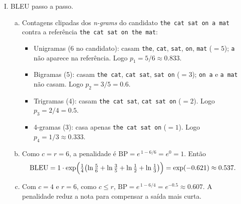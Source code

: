 \documentclass{dlproblemset}
\begin{document}
\begin{enumerate}[I)]
\item BLEU passo a passo.
\begin{enumerate}[(a)]
    \item Contagens clipadas dos \textit{n-grams} do candidato \texttt{the cat sat on a mat}
    contra a referência \texttt{the cat sat on the mat}:
    \begin{itemize}
        \item Unigramas (6 no candidato): casam \texttt{the}, \texttt{cat}, \texttt{sat},
        \texttt{on}, \texttt{mat} ($=5$); \texttt{a} não aparece na referência. Logo
        $p_1 = 5/6 \approx 0.833$.
        \item Bigramas (5): casam \texttt{the cat}, \texttt{cat sat}, \texttt{sat on} ($=3$);
        \texttt{on a} e \texttt{a mat} não casam. Logo $p_2 = 3/5 = 0.6$.
        \item Trigramas (4): casam \texttt{the cat sat}, \texttt{cat sat on} ($=2$). Logo
        $p_3 = 2/4 = 0.5$.
        \item 4-gramas (3): casa apenas \texttt{the cat sat on} ($=1$). Logo
        $p_4 = 1/3 \approx 0.333$.
    \end{itemize}
    \item Como $c = r = 6$, a penalidade é $\text{BP} = e^{\,1 - 6/6} = e^0 = 1$. Então
    \[
        \text{BLEU} = 1 \cdot \exp\Bigl(\tfrac{1}{4}\bigl(\ln\tfrac{5}{6} + \ln\tfrac{3}{5}
        + \ln\tfrac{1}{2} + \ln\tfrac{1}{3}\bigr)\Bigr) = \exp(-0.621) \approx 0.537.
    \]
    \item Com $c = 4$ e $r = 6$, como $c \le r$, $\text{BP} = e^{\,1 - 6/4} = e^{-0.5}
    \approx 0.607$. A penalidade reduz a nota para compensar a saída mais curta.
\end{enumerate}


\end{enumerate}
\end{document}
